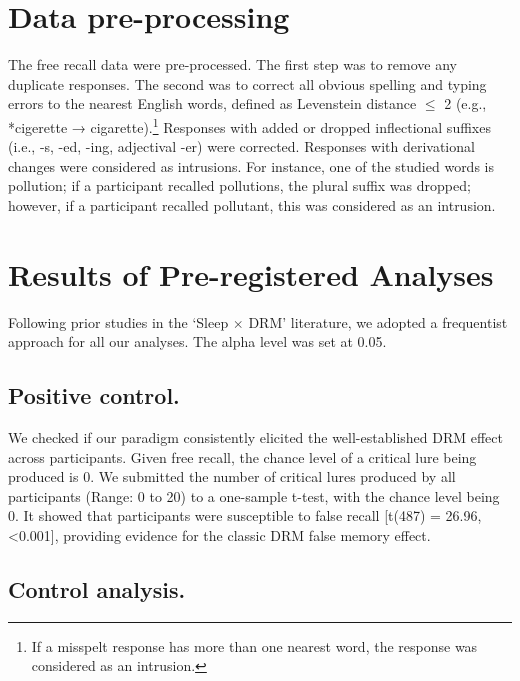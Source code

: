 \documentclass[
]{article}
\begin{document}
\hypertarget{data-pre-processing}{%
\section{Data pre-processing}\label{data-pre-processing}}

The free recall data were pre-processed. The first step was to remove any duplicate responses. The second was to correct all obvious spelling and typing errors to the nearest English words, defined as Levenstein distance \(\leq\) 2 (e.g., *cigerette → cigarette).\footnote{If a misspelt response has more than one nearest word, the response was considered as an intrusion.} Responses with added or dropped inflectional suffixes (i.e., -s, -ed, -ing, adjectival -er) were corrected. Responses with derivational changes were considered as intrusions. For instance, one of the studied words is pollution; if a participant recalled pollutions, the plural suffix was dropped; however, if a participant recalled pollutant, this was considered as an intrusion.

\hypertarget{results-of-pre-registered-analyses}{%
\section{Results of Pre-registered Analyses}\label{results-of-pre-registered-analyses}}

Following prior studies in the `Sleep \(\times\) DRM' literature, we adopted a frequentist approach for all our analyses. The alpha level was set at 0.05.

\hypertarget{positive-control.}{%
\subsection{Positive control.}\label{positive-control.}}

We checked if our paradigm consistently elicited the well-established DRM effect across participants. Given free recall, the chance level of a critical lure being produced is 0. We submitted the number of critical lures produced by all participants (Range: 0 to 20) to a one-sample t-test, with the chance level being 0. It showed that participants were susceptible to false recall {[}t(487) = 26.96, \textless0.001{]}, providing evidence for the classic DRM false memory effect.

\hypertarget{control-analysis.}{%
\subsection{Control analysis.}\label{control-analysis.}}
\end{document}
